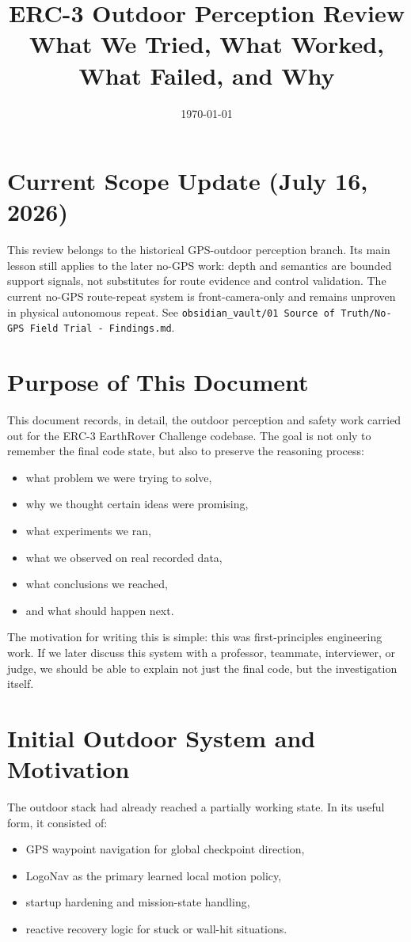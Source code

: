 \documentclass[11pt]{article}
\title{ERC-3 Outdoor Perception Review\\
\large What We Tried, What Worked, What Failed, and Why}
\author{}
\date{\today}
\begin{document}
\maketitle

\section*{Current Scope Update (July 16, 2026)}
This review belongs to the historical GPS-outdoor perception branch. Its main
lesson still applies to the later no-GPS work: depth and semantics are bounded
support signals, not substitutes for route evidence and control validation. The
current no-GPS route-repeat system is front-camera-only and remains unproven in
physical autonomous repeat. See
\texttt{obsidian\_vault/01 Source of Truth/No-GPS Field Trial - Findings.md}.

\section{Purpose of This Document}
This document records, in detail, the outdoor perception and safety work carried out for the ERC-3 EarthRover Challenge codebase. The goal is not only to remember the final code state, but also to preserve the reasoning process:
\begin{itemize}[leftmargin=*]
\item what problem we were trying to solve,
\item why we thought certain ideas were promising,
\item what experiments we ran,
\item what we observed on real recorded data,
\item what conclusions we reached,
\item and what should happen next.
\end{itemize}

The motivation for writing this is simple: this was first-principles engineering work. If we later discuss this system with a professor, teammate, interviewer, or judge, we should be able to explain not just the final code, but the investigation itself.

\section{Initial Outdoor System and Motivation}
The outdoor stack had already reached a partially working state. In its useful form, it consisted of:
\begin{itemize}[leftmargin=*]
\item GPS waypoint navigation for global checkpoint direction,
\item LogoNav as the primary learned local motion policy,
\item startup hardening and mission-state handling,
\item reactive recovery logic for stuck or wall-hit situations.
\end{itemize}
\end{document}
